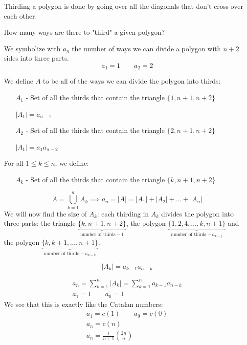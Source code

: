 \documentclass[00_complete]{subfiles}
\begin{document}
\begin{example}
Thirding a polygon is done by going over all the diagonals that don't
cross over each other.

How many ways are there to "third" a given polygon?

We symbolize with $a_n$ the number of ways we can divide a polygon with
$n+2$ sides into three parts.
$$a_1=1 \qquad a_2=2$$

We define $A$ to be all of the ways we can divide the polygon into thirds:

\begin{itemize}
    \item[$A_1$ -] Set of all the thirds that contain the triangle
        $\{1,n+1,n+2\}$

    $|A_1|=a_{n-1}$
    \item[$A_2$ -] Set of all the thirds that contain the triangle
        $\{2,n+1,n+2\}$

    $|A_1|=a_{1}a_{n-2}$
\end{itemize}
For all $1 \leq k \leq n$, we define:
\begin{itemize}
    \item[$A_k$ -] Set of all the thirds that contain the triangle
        $\{k,n+1,n+2\}$
\end{itemize}
$$A=\bigcup_{k=1}^n A_k \implies a_n =|A|=|A_1|+|A_2|+\dots+|A_n|$$
We will now find the size of $A_k$: each thirding in $A_k$ divides the
polygon into three parts: the triangle
$\underbrace{\{k,n+1,n+2\}}_{\text{number of thirds}-1}$, the polygon
$\underbrace{\{1,2,4,\dots,k,n+1\}}_{\text{number of thirds}-a_{k-1}}$ and the
polygon $\underbrace{\{k,k+1,\dots,n+1\}}_{\text{number of thirds}-a_{n-k}}$.

$$|A_k|=a_{k-1}a_{n-k}$$
\begin{conclusion}
    \begin{gather*}
        a_n=\sum_{k=1}^{n}|A_k|=\sum_{k=1}^{n}a_{k-1}a_{n-k} \\
        a_1 = 1 \qquad a_0 = 1
    \end{gather*}
    We see that this is exactly like the Catalan numbers:
    \begin{gather*}
        a_1=c(1) \qquad a_0=c(0) \\
        a_n=c(n) \\
        \boxed{a_n=\frac{1}{n+1}\binom{2n}{n}}
    \end{gather*}
\end{conclusion}
\end{example}
\end{document}
